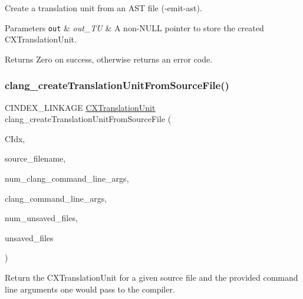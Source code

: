 Create a translation unit from an A\+ST file ({\ttfamily -\/emit-\/ast}). 


\begin{DoxyParams}[1]{Parameters}
\mbox{\tt out}  & {\em out\+\_\+\+TU} & A non-\/\+N\+U\+LL pointer to store the created {\ttfamily C\+X\+Translation\+Unit}.\\
\hline
\end{DoxyParams}
\begin{DoxyReturn}{Returns}
Zero on success, otherwise returns an error code. 
\end{DoxyReturn}
\mbox{\label{group__CINDEX__TRANSLATION__UNIT_gaf45dfbcd2e4d8e9eeab4778f994a74c3}} 
\subsubsection{\texorpdfstring{clang\+\_\+create\+Translation\+Unit\+From\+Source\+File()}{clang\_createTranslationUnitFromSourceFile()}}
{\footnotesize\ttfamily C\+I\+N\+D\+E\+X\+\_\+\+L\+I\+N\+K\+A\+GE \mbox{\hyperlink{group__CINDEX_gacdb7815736ca709ce9a5e1ec2b7e16ac}{C\+X\+Translation\+Unit}} clang\+\_\+create\+Translation\+Unit\+From\+Source\+File (\begin{DoxyParamCaption}\item[{\mbox{\hyperlink{group__CINDEX_gae039c2574bfd75774ca7a9a3e55910cb}{C\+X\+Index}}}]{C\+Idx,  }\item[{const char $\ast$}]{source\+\_\+filename,  }\item[{int}]{num\+\_\+clang\+\_\+command\+\_\+line\+\_\+args,  }\item[{const char $\ast$const $\ast$}]{clang\+\_\+command\+\_\+line\+\_\+args,  }\item[{unsigned}]{num\+\_\+unsaved\+\_\+files,  }\item[{struct \mbox{\hyperlink{structCXUnsavedFile}{C\+X\+Unsaved\+File}} $\ast$}]{unsaved\+\_\+files }\end{DoxyParamCaption})}



Return the C\+X\+Translation\+Unit for a given source file and the provided command line arguments one would pass to the compiler. 

